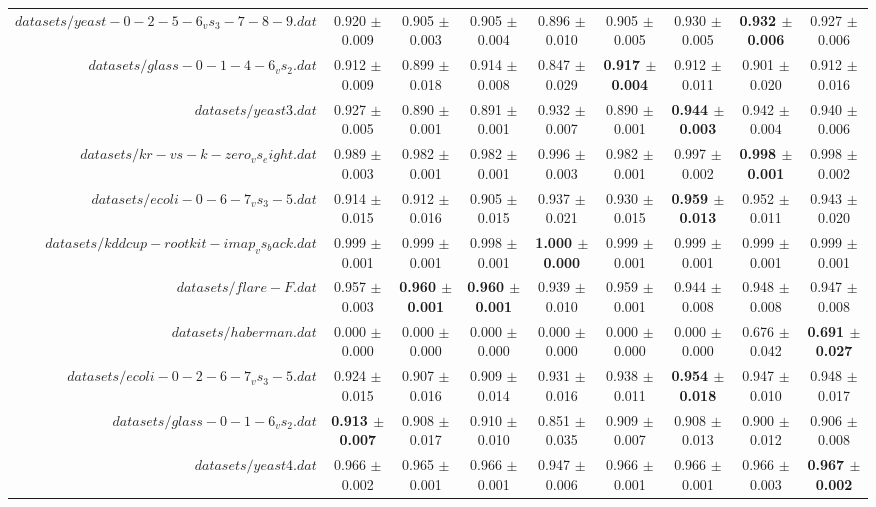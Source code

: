 \begin{table}[!ht]
{\begin{tabular}{r c c c c c c c c}
$datasets/yeast-0-2-5-6_vs_3-7-8-9.dat$ & 0.920 $\pm$ 0.009 & 0.905 $\pm$ 0.003 & 0.905 $\pm$ 0.004 & 0.896 $\pm$ 0.010 & 0.905 $\pm$ 0.005 & 0.930 $\pm$ 0.005 & \textbf{0.932 $\pm$ 0.006} & 0.927 $\pm$ 0.006 \\
$datasets/glass-0-1-4-6_vs_2.dat$ & 0.912 $\pm$ 0.009 & 0.899 $\pm$ 0.018 & 0.914 $\pm$ 0.008 & 0.847 $\pm$ 0.029 & \textbf{0.917 $\pm$ 0.004} & 0.912 $\pm$ 0.011 & 0.901 $\pm$ 0.020 & 0.912 $\pm$ 0.016 \\
$datasets/yeast3.dat$ & 0.927 $\pm$ 0.005 & 0.890 $\pm$ 0.001 & 0.891 $\pm$ 0.001 & 0.932 $\pm$ 0.007 & 0.890 $\pm$ 0.001 & \textbf{0.944 $\pm$ 0.003} & 0.942 $\pm$ 0.004 & 0.940 $\pm$ 0.006 \\
$datasets/kr-vs-k-zero_vs_eight.dat$ & 0.989 $\pm$ 0.003 & 0.982 $\pm$ 0.001 & 0.982 $\pm$ 0.001 & 0.996 $\pm$ 0.003 & 0.982 $\pm$ 0.001 & 0.997 $\pm$ 0.002 & \textbf{0.998 $\pm$ 0.001} & 0.998 $\pm$ 0.002 \\
$datasets/ecoli-0-6-7_vs_3-5.dat$ & 0.914 $\pm$ 0.015 & 0.912 $\pm$ 0.016 & 0.905 $\pm$ 0.015 & 0.937 $\pm$ 0.021 & 0.930 $\pm$ 0.015 & \textbf{0.959 $\pm$ 0.013} & 0.952 $\pm$ 0.011 & 0.943 $\pm$ 0.020 \\
$datasets/kddcup-rootkit-imap_vs_back.dat$ & 0.999 $\pm$ 0.001 & 0.999 $\pm$ 0.001 & 0.998 $\pm$ 0.001 & \textbf{1.000 $\pm$ 0.000} & 0.999 $\pm$ 0.001 & 0.999 $\pm$ 0.001 & 0.999 $\pm$ 0.001 & 0.999 $\pm$ 0.001 \\
$datasets/flare-F.dat$ & 0.957 $\pm$ 0.003 & \textbf{0.960 $\pm$ 0.001} & \textbf{0.960 $\pm$ 0.001} & 0.939 $\pm$ 0.010 & 0.959 $\pm$ 0.001 & 0.944 $\pm$ 0.008 & 0.948 $\pm$ 0.008 & 0.947 $\pm$ 0.008 \\
$datasets/haberman.dat$ & 0.000 $\pm$ 0.000 & 0.000 $\pm$ 0.000 & 0.000 $\pm$ 0.000 & 0.000 $\pm$ 0.000 & 0.000 $\pm$ 0.000 & 0.000 $\pm$ 0.000 & 0.676 $\pm$ 0.042 & \textbf{0.691 $\pm$ 0.027} \\
$datasets/ecoli-0-2-6-7_vs_3-5.dat$ & 0.924 $\pm$ 0.015 & 0.907 $\pm$ 0.016 & 0.909 $\pm$ 0.014 & 0.931 $\pm$ 0.016 & 0.938 $\pm$ 0.011 & \textbf{0.954 $\pm$ 0.018} & 0.947 $\pm$ 0.010 & 0.948 $\pm$ 0.017 \\
$datasets/glass-0-1-6_vs_2.dat$ & \textbf{0.913 $\pm$ 0.007} & 0.908 $\pm$ 0.017 & 0.910 $\pm$ 0.010 & 0.851 $\pm$ 0.035 & 0.909 $\pm$ 0.007 & 0.908 $\pm$ 0.013 & 0.900 $\pm$ 0.012 & 0.906 $\pm$ 0.008 \\
$datasets/yeast4.dat$ & 0.966 $\pm$ 0.002 & 0.965 $\pm$ 0.001 & 0.966 $\pm$ 0.001 & 0.947 $\pm$ 0.006 & 0.966 $\pm$ 0.001 & 0.966 $\pm$ 0.001 & 0.966 $\pm$ 0.003 & \textbf{0.967 $\pm$ 0.002} \\

\end{tabular}}
\end{table}
